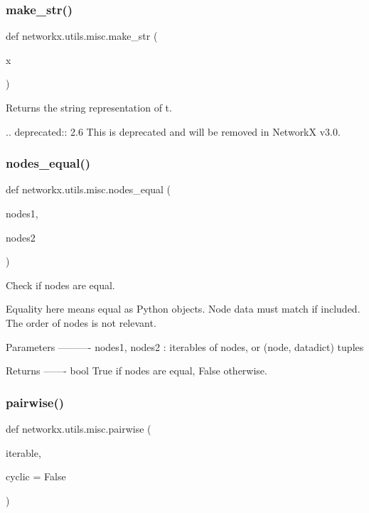 \subsubsection{\texorpdfstring{make\+\_\+str()}{make\_str()}}
{\footnotesize\ttfamily def networkx.\+utils.\+misc.\+make\+\_\+str (\begin{DoxyParamCaption}\item[{}]{x }\end{DoxyParamCaption})}

\begin{DoxyVerb}Returns the string representation of t.

.. deprecated:: 2.6
    This is deprecated and will be removed in NetworkX v3.0.
\end{DoxyVerb}
 \mbox{\label{namespacenetworkx_1_1utils_1_1misc_a11d6d25970c3c7b729c775aa8949ce9f}} 
\subsubsection{\texorpdfstring{nodes\+\_\+equal()}{nodes\_equal()}}
{\footnotesize\ttfamily def networkx.\+utils.\+misc.\+nodes\+\_\+equal (\begin{DoxyParamCaption}\item[{}]{nodes1,  }\item[{}]{nodes2 }\end{DoxyParamCaption})}

\begin{DoxyVerb}Check if nodes are equal.

Equality here means equal as Python objects.
Node data must match if included.
The order of nodes is not relevant.

Parameters
----------
nodes1, nodes2 : iterables of nodes, or (node, datadict) tuples

Returns
-------
bool
    True if nodes are equal, False otherwise.
\end{DoxyVerb}
 \mbox{\label{namespacenetworkx_1_1utils_1_1misc_a3a5a039422a593c49554f67d5ed353ac}} 
\subsubsection{\texorpdfstring{pairwise()}{pairwise()}}
{\footnotesize\ttfamily def networkx.\+utils.\+misc.\+pairwise (\begin{DoxyParamCaption}\item[{}]{iterable,  }\item[{}]{cyclic = {\ttfamily False} }\end{DoxyParamCaption})}

